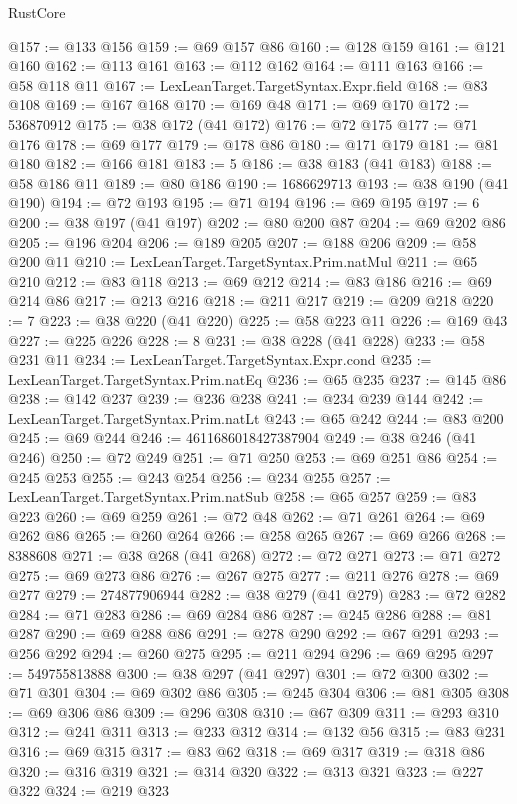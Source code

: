 \begin{lexlean}{RustCore}
\begin{coremodule}
@157 := @133 @156
@159 := @69 @157 @86
@160 := @128 @159
@161 := @121 @160
@162 := @113 @161
@163 := @112 @162
@164 := @111 @163
@166 := @58 @118 @11
@167 := LexLeanTarget.TargetSyntax.Expr.field
@168 := @83 @108
@169 := @167 @168
@170 := @169 @48
@171 := @69 @170
@172 := 536870912
@175 := @38 @172 (@41 @172)
@176 := @72 @175
@177 := @71 @176
@178 := @69 @177
@179 := @178 @86
@180 := @171 @179
@181 := @81 @180
@182 := @166 @181
@183 := 5
@186 := @38 @183 (@41 @183)
@188 := @58 @186 @11
@189 := @80 @186
@190 := 1686629713
@193 := @38 @190 (@41 @190)
@194 := @72 @193
@195 := @71 @194
@196 := @69 @195
@197 := 6
@200 := @38 @197 (@41 @197)
@202 := @80 @200 @87
@204 := @69 @202 @86
@205 := @196 @204
@206 := @189 @205
@207 := @188 @206
@209 := @58 @200 @11
@210 := LexLeanTarget.TargetSyntax.Prim.natMul
@211 := @65 @210
@212 := @83 @118
@213 := @69 @212
@214 := @83 @186
@216 := @69 @214 @86
@217 := @213 @216
@218 := @211 @217
@219 := @209 @218
@220 := 7
@223 := @38 @220 (@41 @220)
@225 := @58 @223 @11
@226 := @169 @43
@227 := @225 @226
@228 := 8
@231 := @38 @228 (@41 @228)
@233 := @58 @231 @11
@234 := LexLeanTarget.TargetSyntax.Expr.cond
@235 := LexLeanTarget.TargetSyntax.Prim.natEq
@236 := @65 @235
@237 := @145 @86
@238 := @142 @237
@239 := @236 @238
@241 := @234 @239 @144
@242 := LexLeanTarget.TargetSyntax.Prim.natLt
@243 := @65 @242
@244 := @83 @200
@245 := @69 @244
@246 := 4611686018427387904
@249 := @38 @246 (@41 @246)
@250 := @72 @249
@251 := @71 @250
@253 := @69 @251 @86
@254 := @245 @253
@255 := @243 @254
@256 := @234 @255
@257 := LexLeanTarget.TargetSyntax.Prim.natSub
@258 := @65 @257
@259 := @83 @223
@260 := @69 @259
@261 := @72 @48
@262 := @71 @261
@264 := @69 @262 @86
@265 := @260 @264
@266 := @258 @265
@267 := @69 @266
@268 := 8388608
@271 := @38 @268 (@41 @268)
@272 := @72 @271
@273 := @71 @272
@275 := @69 @273 @86
@276 := @267 @275
@277 := @211 @276
@278 := @69 @277
@279 := 274877906944
@282 := @38 @279 (@41 @279)
@283 := @72 @282
@284 := @71 @283
@286 := @69 @284 @86
@287 := @245 @286
@288 := @81 @287
@290 := @69 @288 @86
@291 := @278 @290
@292 := @67 @291
@293 := @256 @292
@294 := @260 @275
@295 := @211 @294
@296 := @69 @295
@297 := 549755813888
@300 := @38 @297 (@41 @297)
@301 := @72 @300
@302 := @71 @301
@304 := @69 @302 @86
@305 := @245 @304
@306 := @81 @305
@308 := @69 @306 @86
@309 := @296 @308
@310 := @67 @309
@311 := @293 @310
@312 := @241 @311
@313 := @233 @312
@314 := @132 @56
@315 := @83 @231
@316 := @69 @315
@317 := @83 @62
@318 := @69 @317
@319 := @318 @86
@320 := @316 @319
@321 := @314 @320
@322 := @313 @321
@323 := @227 @322
@324 := @219 @323

\end{coremodule}
\end{lexlean}
